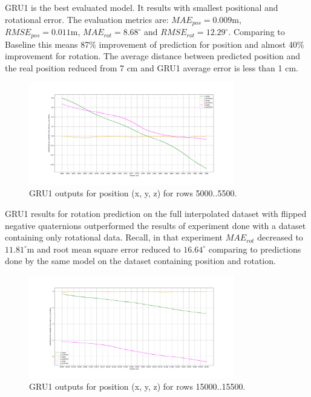 GRU1 is the best evaluated model. It results with smallest positional and rotational error. The evaluation metrics are: $MAE_{pos} = 0.009$m, $RMSE_{pos} = 0.011$m, $MAE_{rot} = 8.68^{\circ}$ and $RMSE_{rot}  =12.29^{\circ}$. Comparing to Baseline this means 87\% improvement of prediction for position and almost 40\% improvement for rotation. The average distance between predicted position and the real position reduced from 7 cm and GRU1 average error is less than 1 cm. 
\begin{figure}[b!]
	\begin{center}
		\includegraphics[width=0.8\textwidth, keepaspectratio]{gfx/gru1-xyz_position.pdf}
		\caption{GRU1 outputs for position (x, y, z) for rows 5000..5500.}
		\label{fig:gru1-1}
	\end{center}
\end{figure}

GRU1 results for rotation prediction on the full interpolated dataset with flipped negative quaternions outperformed the results of experiment done with a dataset containing only rotational data. Recall, in that experiment $MAE_{rot}$ decreased to $11.81^{\circ}$m and root mean square error reduced to  $16.64^{\circ}$ comparing to predictions done by the same model on the dataset containing position and rotation.
\begin{figure}[t!]
	\begin{center}
		\includegraphics[width=0.8\textwidth]{gfx/gru1-xyz_position_15000.pdf}
		\caption{GRU1 outputs for position (x, y, z) for rows 15000..15500.}
		\label{fig:gru1-2}
	\end{center}
\end{figure}

